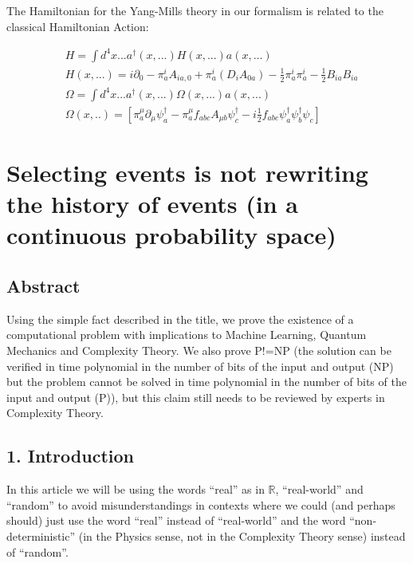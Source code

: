 \documentclass[11pt]{book}
\begin{document}
The Hamiltonian for the Yang-Mills theory in our formalism is related to
the classical Hamiltonian
Action\cite{Mukhanov1995On}:

\begin{equation}\begin{aligned}
    &H=\int d^4 x ... a^\dagger(x, ...)H(x, ...) a(x, ...)\\
&H(x, ...)=i\partial_0-\pi^i_a A_{i a, 0}+ \pi^i_a (D_i A_{0 a})-\frac{1}{2}\pi^i_a\pi^i_a
    -\frac{1}{2} B_{i a} B_{i a}\\
    &\Omega=\int d^4 x ...  a^\dagger(x, ...) \Omega(x,...) a(x, ...)\\
    &\Omega(x,..)=\left[ \pi^{\mu}_{a} \partial_{\mu} \psi^\dagger_{a}-\pi^{\mu}_{a} f_{a b c} A_{\mu b} \psi^\dagger_{c} -i \frac{1}{2}f_{a b c} \psi^\dagger_{a} \psi^\dagger_{b} \psi_{c}\right]
\end{aligned}\end{equation}

\chapter{Selecting events is not rewriting the history of events (in a continuous probability space)}
\section*{Abstract}
Using the simple fact described in the title, we prove the existence of
a computational problem with implications to Machine Learning, Quantum
Mechanics and Complexity Theory. We also prove P!=NP (the solution can
be verified in time polynomial in the number of bits of the input and
output (NP) but the problem cannot be solved in time polynomial in the
number of bits of the input and output (P)), but this claim still needs
to be reviewed by experts in Complexity Theory.


\hypertarget{introduction}{%
\section{1. Introduction}\label{introduction}}

In this article we will be using the words ``real'' as in
\(\mathbb{R}\), ``real-world'' and ``random'' to avoid misunderstandings
in contexts where we could (and perhaps should) just use the word
``real'' instead of ``real-world'' and the word ``non-deterministic''
(in the Physics sense, not in the Complexity Theory sense) instead of
``random''.
\end{document}
